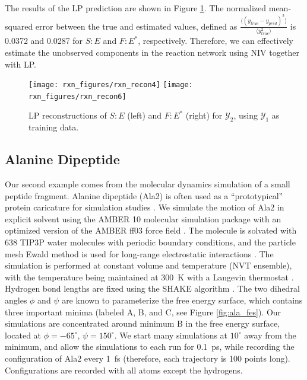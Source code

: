 \documentclass[aip,jcp,preprint]{revtex4-1}
\begin{document}
The results of the LP prediction are shown in Figure \ref{fig:rxn_recon}.
%
The normalized mean-squared error between the true and estimated values, defined as $\frac{\langle (y_{true}-y_{pred})^2 \rangle}{\langle y_{true}^2 \rangle}$ is 0.0372 and 0.0287 for $S:E$ and $F:E^{*}$, respectively.
%
Therefore, we can effectively estimate the unobserved components in the reaction network using NIV together with LP.
%


\begin{figure}[ht]
    \texttt{[image: rxn\_figures/rxn\_recon4]}
    \texttt{[image: rxn\_figures/rxn\_recon6]}
    \caption{LP reconstructions of $S:E$ (left) and $F:E^{*}$ (right) for $\mathcal{Y}_2$, using $\mathcal{Y}_1$ as training data.}
    \label{fig:rxn_recon}
\end{figure}

\subsection{Alanine Dipeptide}

Our second example comes from the molecular dynamics simulation of a small peptide fragment.
%
Alanine dipeptide (Ala2) is often used as a ``prototypical'' protein caricature for simulation studies
\cite{apostolakis1999calculation, bolhuis2000reaction, chekmarev2004long, ma2005automatic, frewen2009exploration, ferguson2011integrating}.
%
We simulate the motion of Ala2 in explicit solvent using the AMBER 10 molecular simulation package \cite{case2008Amber} with an
optimized version \cite{best2009optimized} of the AMBER ff03 force field \cite{duan2003point}.
%
The molecule is solvated with 638 TIP3P water molecules \cite{jorgensen1983comparison}
with periodic boundary conditions, and the particle mesh Ewald method is used for long-range electrostatic interactions \cite{essmann1995smooth}.
%
The simulation is performed at constant volume and temperature (NVT ensemble), with the temperature being maintained at 300~K with a Langevin thermostat \cite{loncharich1992langevin}.
%
Hydrogen bond lengths are fixed using the SHAKE algorithm \cite{ryckaert1977numerical}.
%
The two dihedral angles $\phi$ and $\psi$ are known to parameterize the free energy surface, which contains three important minima (labeled A, B, and C, see Figure \ref{fig:ala_fes}).
%
Our simulations are concentrated around minimum B in the free energy surface, located at $\phi=-65^{\circ}$, $\psi=150^{\circ}$.
%
We start many simulations at $10^{\circ}$ away from the minimum, and allow the simulations to each run for 0.1~ps, while recording the configuration of Ala2 every 1~fs (therefore, each trajectory is 100 points long).
%
Configurations are recorded with all atoms except the hydrogens.
\end{document}

